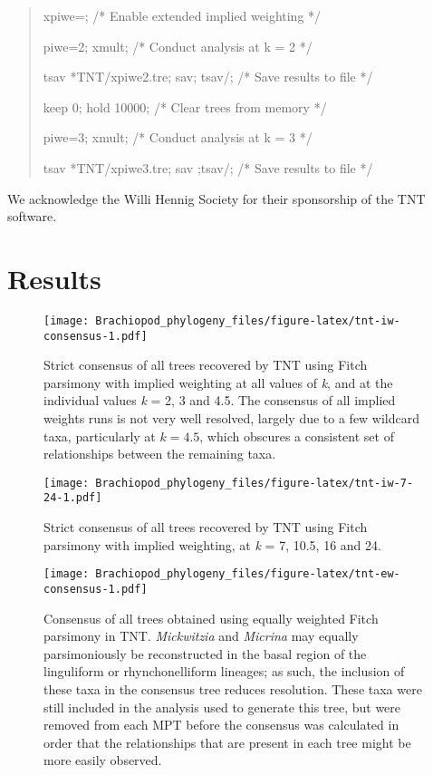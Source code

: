 \documentclass[openany]{book}
\theoremstyle{definition}
\theoremstyle{definition}
\theoremstyle{definition}
\theoremstyle{remark}
\begin{document}
\begin{quote}
xpiwe=; {/* Enable extended implied weighting */}

piwe=2; xmult; {/* Conduct analysis at k = 2 */}

tsav *TNT/xpiwe2.tre; sav; tsav/; {/* Save results to file */}

keep 0; hold 10000; {/* Clear trees from memory */}

piwe=3; xmult; {/* Conduct analysis at k = 3 */}

tsav *TNT/xpiwe3.tre; sav ;tsav/; {/* Save results to file */}
\end{quote}

We acknowledge the Willi Hennig Society for their sponsorship of the TNT
software.

\section{Results}\label{results-1}









\begin{figure}
\centering
\texttt{[image: Brachiopod\_phylogeny\_files/figure-latex/tnt-iw-consensus-1.pdf]}
\caption{\label{fig:tnt-iw-consensus}Strict consensus of all trees recovered by TNT
using Fitch parsimony with implied weighting at all values of \emph{k}, and at the individual
values \emph{k} = 2, 3 and 4.5.
The consensus of all implied weights runs is
not very well resolved, largely due to a few wildcard taxa, particularly
at \(k = 4.5\), which obscures a consistent set of relationships between
the remaining taxa.}
\end{figure}

\begin{figure}
\centering
\texttt{[image: Brachiopod\_phylogeny\_files/figure-latex/tnt-iw-7-24-1.pdf]}
\caption{\label{fig:tnt-iw-7-24}Strict consensus of all trees recovered by TNT
using Fitch parsimony with implied weighting, at \emph{k} = 7, 10.5, 16 and 24.}
\end{figure}

\newpage










\begin{figure}
\centering
\texttt{[image: Brachiopod\_phylogeny\_files/figure-latex/tnt-ew-consensus-1.pdf]}
\caption{\label{fig:tnt-ew-consensus}Consensus of all trees obtained using equally weighted
Fitch parsimony in TNT. \emph{Mickwitzia} and \emph{Micrina} may equally
parsimoniously be reconstructed in the basal region of the linguliform
or rhynchonelliform lineages; as such, the inclusion of these taxa in
the consensus tree reduces resolution. These taxa were still included in
the analysis used to generate this tree, but were removed from each MPT
before the consensus was calculated in order that the relationships that
are present in each tree might be more easily observed.}
\end{figure}
\end{document}
